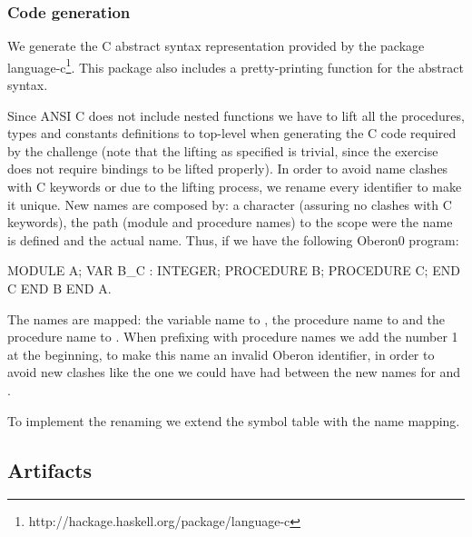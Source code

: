 \subsubsection{Code generation}

We generate the C abstract syntax representation provided by the package language-c\footnote{http://hackage.haskell.org/package/language-c}.
This package also includes a pretty-printing function for the abstract syntax.

Since ANSI C does not include nested functions  we have to lift  all the procedures, 
types and constants definitions to top-level when generating the C code required by the challenge (note that  the lifting as specified is trivial, 
since the exercise does not require bindings to be lifted properly).
In order to avoid name clashes with C keywords or due to the lifting process, we rename every identifier to make it unique.  
New names are composed by: a character  (assuring no clashes with C keywords),
the path (module and procedure names) to the scope were the name is defined and the actual name. 
Thus, if we have the following Oberon0 program:
\begin{oberon0}
MODULE A;
  VAR B_C : INTEGER;
  PROCEDURE B;
    PROCEDURE C;
    END C
  END B
END A.
\end{oberon0}
The names are mapped: the variable name  to ,
the procedure name  to  and
the procedure name  to .
When prefixing with procedure names we add the number 1 at the beginning,
to make this name an invalid Oberon identifier, in order to avoid new clashes
like the one we could have had between the new names for 
and .

To implement the renaming we extend the symbol table with the name mapping.

\subsection{Artifacts}

